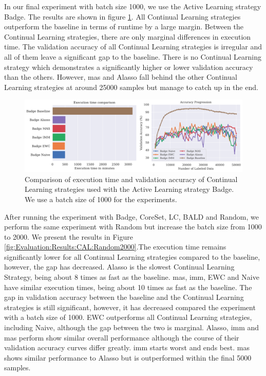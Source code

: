 In our final experiment with batch size 1000, we use the Active Learning strategy Badge. The results are shown in figure \ref{fig:Evaluation:Results:CAL:Badge1000}. All Continual Learning strategies
outperform the baseline in terms of runtime by a large margin. Between the Continual Learning strategies, there are only marginal differences in execution time. The validation accuracy of all Continual
Learning strategies is irregular and all of them leave a significant gap to the baseline. There is no Continual Learning strategy which demonstrates a significantly higher or lower validation accuracy
than the others. However, \gls{mas} and Alasso fall behind the other Continual Learning strategies at around 25000 samples but manage to catch up in the end. \par

\begin{figure}[h]
    \centering
    \includegraphics[width=\linewidth]{images/results_CAL/Badge_CAL_1000b.png}
    \caption[Continual Active Learning Badge 1000 batch size]{Comparison of execution time and validation accuracy of Continual Learning strategies used with the Active Learning strategy
    Badge. We use a batch size of 1000 for the experiments. }
    \label{fig:Evaluation:Results:CAL:Badge1000}
\end{figure}

After running the experiment with Badge, CoreSet, LC, BALD and Random, we perform the same experiment with Random but increase the batch size from 1000 to 2000. We present the results in
Figure \ref{fig:Evaluation:Results:CAL:Random2000}.The execution time remains significantly lower for all Continual Learning strategies compared to the baseline, however, the gap has decreased. 
Alasso is the slowest Continual Learning Strategy, being about 8 times as fast as the baseline. \gls{mas}, \gls{imm}, EWC and Naive have similar execution times, being about 10 times as fast as the baseline. 
The gap in validation accuracy between the baseline and the Continual Learning strategies is still significant, however, it has decreased compared the experiment with a batch size of 1000.
EWC outperforms all Continual Learning strategies, including Naive, although the gap between the two is marginal. Alasso, \gls{imm} and \gls{mas} perform show similar overall performance although the course
of their validation accuracy curves differ greatly. \gls{imm} starts worst and ends best. \gls{mas} shows similar performance to Alasso but is outperformed within the final 5000 samples. \par

